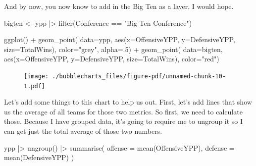 \documentclass[
  letterpaper,
  DIV=11,
  numbers=noendperiod]{scrreprt}
\newenvironment{Shaded}{\begin{snugshade}}{\end{snugshade}}
\newcommand{\AttributeTok}[1]{\textcolor[rgb]{0.40,0.45,0.13}{#1}}
\newcommand{\DecValTok}[1]{\textcolor[rgb]{0.68,0.00,0.00}{#1}}
\newcommand{\FunctionTok}[1]{\textcolor[rgb]{0.28,0.35,0.67}{#1}}
\newcommand{\NormalTok}[1]{\textcolor[rgb]{0.00,0.23,0.31}{#1}}
\newcommand{\OtherTok}[1]{\textcolor[rgb]{0.00,0.23,0.31}{#1}}
\newcommand{\SpecialCharTok}[1]{\textcolor[rgb]{0.37,0.37,0.37}{#1}}
\newcommand{\StringTok}[1]{\textcolor[rgb]{0.13,0.47,0.30}{#1}}
\begin{document}
And by now, you now know to add in the Big Ten as a layer, I would hope.

\begin{Shaded}
\begin{Highlighting}[]
\NormalTok{bigten }\OtherTok{\textless{}{-}}\NormalTok{ ypp }\SpecialCharTok{|\textgreater{}} \FunctionTok{filter}\NormalTok{(Conference }\SpecialCharTok{==} \StringTok{"Big Ten Conference"}\NormalTok{)}
\end{Highlighting}
\end{Shaded}

\begin{Shaded}
\begin{Highlighting}[]
\FunctionTok{ggplot}\NormalTok{() }\SpecialCharTok{+} 
  \FunctionTok{geom\_point}\NormalTok{(}
    \AttributeTok{data=}\NormalTok{ypp, }
    \FunctionTok{aes}\NormalTok{(}\AttributeTok{x=}\NormalTok{OffensiveYPP, }\AttributeTok{y=}\NormalTok{DefensiveYPP, }\AttributeTok{size=}\NormalTok{TotalWins), }
    \AttributeTok{color=}\StringTok{"grey"}\NormalTok{, }
    \AttributeTok{alpha=}\NormalTok{.}\DecValTok{5}\NormalTok{) }\SpecialCharTok{+} 
  \FunctionTok{geom\_point}\NormalTok{(}
    \AttributeTok{data=}\NormalTok{bigten, }
    \FunctionTok{aes}\NormalTok{(}\AttributeTok{x=}\NormalTok{OffensiveYPP, }\AttributeTok{y=}\NormalTok{DefensiveYPP, }\AttributeTok{size=}\NormalTok{TotalWins), }
    \AttributeTok{color=}\StringTok{"red"}\NormalTok{)}
\end{Highlighting}
\end{Shaded}

\begin{figure}[H]

{\centering \texttt{[image: ./bubblecharts\_files/figure-pdf/unnamed-chunk-10-1.pdf]}

}

\end{figure}

Let's add some things to this chart to help us out. First, let's add
lines that show us the average of all teams for those two metrics. So
first, we need to calculate those. Because I have grouped data, it's
going to require me to ungroup it so I can get just the total average of
those two numbers.

\begin{Shaded}
\begin{Highlighting}[]
\NormalTok{ypp }\SpecialCharTok{|\textgreater{}} 
  \FunctionTok{ungroup}\NormalTok{() }\SpecialCharTok{|\textgreater{}} 
  \FunctionTok{summarise}\NormalTok{(}
    \AttributeTok{offense =} \FunctionTok{mean}\NormalTok{(OffensiveYPP), }
    \AttributeTok{defense =} \FunctionTok{mean}\NormalTok{(DefensiveYPP)}
\NormalTok{    )}
\end{Highlighting}
\end{Shaded}
\end{document}
